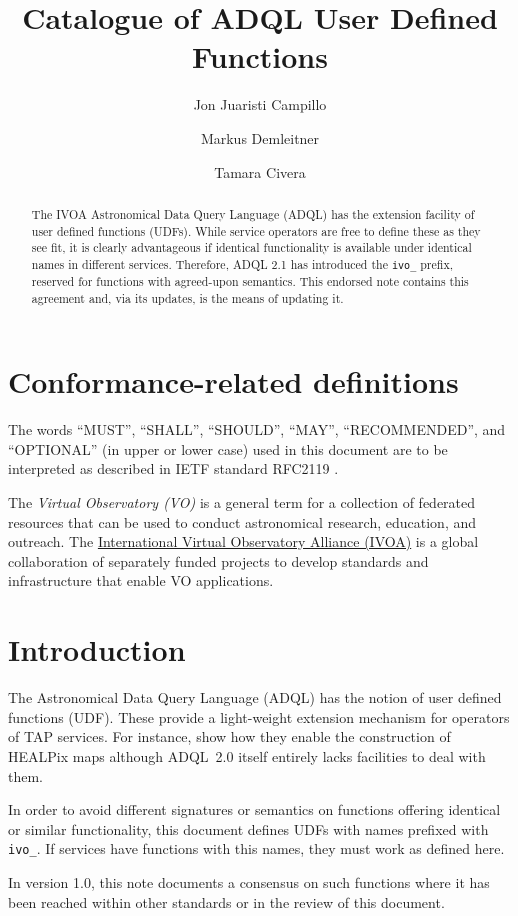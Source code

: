 \documentclass[11pt,a4paper]{ivoa}
\title{Catalogue of ADQL User Defined Functions}
\author[https://wiki.ivoa.net/twiki/bin/view/IVOA/JonJuaristiCampillo]{Jon Juaristi Campillo}
\author[https://wiki.ivoa.net/twiki/bin/view/IVOA/MarkusDemleitner]{Markus Demleitner}
\author[https://wiki.ivoa.net/twiki/bin/view/IVOA/TamaraCivera]{Tamara Civera}
\begin{document}
\begin{abstract}
The IVOA Astronomical Data Query Language (ADQL) has the extension
facility of user defined functions (UDFs).  While service operators are
free to define these as they see fit, it is clearly advantageous if
identical functionality is available under identical names in different
services.  Therefore, ADQL 2.1 has introduced the \verb|ivo_| prefix,
reserved for functions with agreed-upon semantics.  This endorsed note
contains this agreement and, via its updates, is the means of updating
it.
\end{abstract}


\section*{Conformance-related definitions}

The words ``MUST'', ``SHALL'', ``SHOULD'', ``MAY'', ``RECOMMENDED'', and
``OPTIONAL'' (in upper or lower case) used in this document are to be
interpreted as described in IETF standard RFC2119 \citep{std:RFC2119}.

The \emph{Virtual Observatory (VO)} is a
general term for a collection of federated resources that can be used
to conduct astronomical research, education, and outreach.
The \href{http://www.ivoa.net}{International
Virtual Observatory Alliance (IVOA)} is a global
collaboration of separately funded projects to develop standards and
infrastructure that enable VO applications.


\section{Introduction}

The Astronomical Data Query Language (ADQL) \citep{2023ivoa.spec.1215M}
has the notion of user defined functions (UDF).  These provide a
light-weight extension mechanism for operators of TAP services.
For instance, \citet{2016arXiv161109190T} show how they enable the
construction of HEALPix maps although ADQL~2.0 itself entirely lacks
facilities to deal with them.

In order to avoid different signatures or semantics on functions
offering identical or similar functionality,  this document defines UDFs
with names prefixed with \verb|ivo_|.  If services have functions with
this names, they must work as defined here.

In version 1.0, this note documents a consensus
on such functions where it has been
reached within other standards or in the review of this document.
\end{document}
